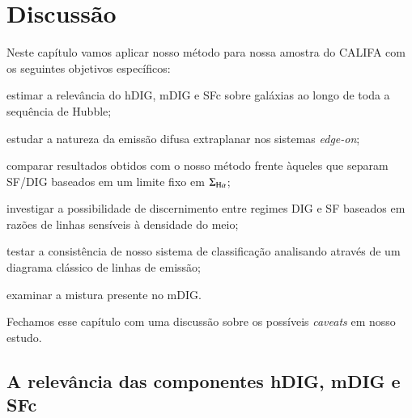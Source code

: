 


\chapter{Discussão}
\label{sec:DIGdisc}

Neste capítulo vamos aplicar nosso método para nossa amostra do CALIFA com os seguintes objetivos específicos:
\begin{enumerate*}[label=(\roman*)]
    \item estimar a relevância do hDIG, mDIG e SFc sobre galáxias ao longo de toda a sequência de Hubble;
    \item estudar a natureza da emissão difusa extraplanar nos sistemas {\em edge-on};
    \item comparar resultados obtidos com o nosso método frente àqueles que separam SF/DIG baseados em um limite fixo em $\Sigma_{\Ha}$;
    \item investigar a possibilidade de discernimento entre regimes DIG e SF baseados em razões de linhas sensíveis à densidade do meio;
    \item testar a consistência de nosso sistema de classificação analisando através de um diagrama clássico de linhas de emissão;
    \item examinar a mistura presente no mDIG.
\end{enumerate*}
Fechamos esse capítulo com uma discussão sobre os possíveis {\em caveats} em nosso estudo.

\section{A relevância das componentes hDIG, mDIG e SFc}
\label{sec:DIGdisc:relstrenghts}

